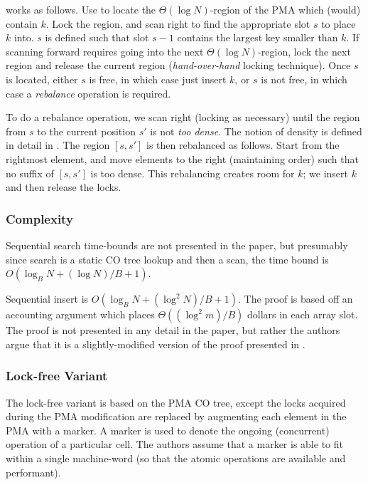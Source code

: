 \documentclass[preprint]{style}
\begin{document}
\Insert{} works as follows. Use \Search{} to locate the $\Theta(\log
N)$-region of the PMA which (would) contain $k$. Lock the region, and scan
right to find the appropriate slot $s$ to place $k$ into. $s$ is defined such
that slot $s - 1$ contains the largest key smaller than $k$. If scanning
forward requires going into the next $\Theta(\log N)$-region, lock the next
region and release the current region (\textit{hand-over-hand} locking
technique). Once $s$ is located, either $s$ is free, in which case just insert
$k$, or $s$ is not free, in which case a \textit{rebalance} operation is
required.

To do a rebalance operation, we scan right (locking as necessary) until the
region from $s$ to the current position $s'$ is not \textit{too dense}. The
notion of density is defined in detail in \cite{BenderFiGi05}. The region $[s,
s']$ is then rebalanced as follows. Start from the rightmost element, and move
elements to the right (maintaining order) such that no suffix of $[s, s']$ is
too dense. This rebalancing creates room for $k$; we insert $k$ and then
release the locks.



\subsubsection{Complexity}


Sequential search time-bounds are not presented in the paper, but presumably
since search is a static CO tree lookup and then a scan, the time bound is
$O(\log_{B}{N} + ({\log{N}})/{B} + 1)$.


Sequential insert is $O(\log_{B}{N} + (\log^2{N})/{B} + 1)$. The proof is based
off an accounting argument which places $\Theta((\log^2{m})/B)$ dollars in each
array slot. The proof is not presented in any detail in the paper, but rather
the authors argue that it is a slightly-modified version of the proof
presented in \cite{Katriel02}.



\subsubsection{Lock-free Variant}

The lock-free variant is based on the PMA CO tree, except the locks acquired
during the PMA modification are replaced by augmenting each element in the PMA
with a marker. A marker is used to denote the ongoing (concurrent) operation of
a particular cell. The authors assume that a marker is able to fit within a
single machine-word (so that the atomic operations are available and
performant).
\end{document}
